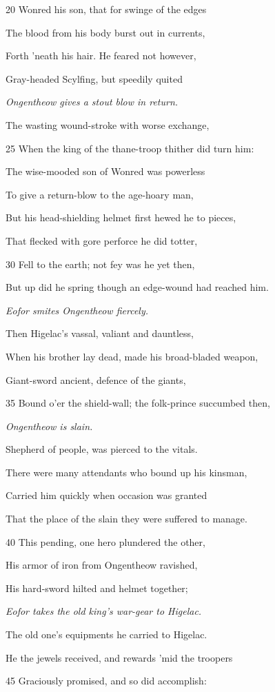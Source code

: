 20
Wonred his son, that for swinge of the edges

The blood from his body burst out in currents,

Forth ’neath his hair. He feared not however,

Gray-headed Scylfing, but speedily quited

\emph{Ongentheow gives
a stout blow in
return.}

The wasting wound-stroke with worse exchange,

25
When the king of the thane-troop thither did turn him:

The wise-mooded son of Wonred was powerless

To give a return-blow to the age-hoary man,

But his head-shielding helmet first hewed he to pieces,

That flecked with gore perforce he did totter,

30
Fell to the earth; not fey was he yet then,

But up did he spring though an edge-wound had reached him.

\emph{Eofor smites Ongentheow
fiercely.}

Then Higelac’s vassal, valiant and dauntless,

When his brother lay dead, made his broad-bladed weapon,

Giant-sword ancient, defence of the giants,

35
Bound o’er the shield-wall; the folk-prince succumbed then,

\emph{Ongentheow is
slain.}

Shepherd of people, was pierced to the vitals.

There were many attendants who bound up his kinsman,

Carried him quickly when occasion was granted

That the place of the slain they were suffered to manage.

40
This pending, one hero plundered the other,

His armor of iron from Ongentheow ravished,

His hard-sword hilted and helmet together;

\emph{Eofor takes the
old king’s war-gear
to Higelac.}

The old one’s equipments he carried to Higelac.

He the jewels received, and rewards ’mid the troopers

45
Graciously promised, and so did accomplish:

